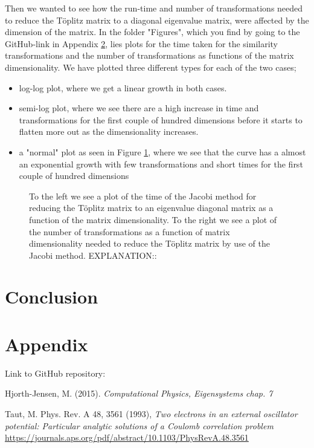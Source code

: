 \documentclass[12pt,a4paper,english]{article}
\begin{document}
Then we wanted to see how the run-time and number of transformations needed to reduce the Töplitz matrix to a diagonal eigenvalue matrix, were affected by the dimension of the matrix. In the folder "Figures", which you find by going to the GitHub-link in Appendix \ref{sect:appendix}, lies plots for the time taken for the similarity transformations and the number of transformations as functions of the matrix dimensionality. We have plotted three different types for each of the two cases; 
\begin{itemize}
	\item log-log plot, where we get a linear growth in both cases.
	\item semi-log plot, where we see there are a high increase in time and transformations for the first couple of hundred dimensions before it starts to flatten more out as the dimensionality increases.
	\item a "normal" plot as seen in Figure \ref{fig:time_transf}, where we see that the curve has a almost an exponential growth with few transformations and short times for the first couple of hundred dimensions
\end{itemize}
\begin{figure}[htbp]
	\caption{To the left we see a plot of the time of the Jacobi method for reducing the Töplitz matrix to an eigenvalue diagonal matrix as a function of the matrix dimensionality. To the right we see a plot of the number of transformations as a function of matrix dimensionality needed to reduce the Töplitz matrix by use of the Jacobi method. EXPLANATION::\label{fig:time_transf}}
\end{figure}

\section{Conclusion}

\appendix
\section{Appendix}
\label{sect:appendix}
Link to GitHub repository:

\begin{thebibliography}{}
Hjorth-Jensen, M. (2015). \textit{Computational Physics, Eigensystems chap. 7}

Taut, M. Phys. Rev. A 48, 3561 (1993), \textit{Two electrons in an external oscillator potential: Particular analytic solutions of a Coulomb correlation problem}\\
\url{https://journals.aps.org/pdf/abstract/10.1103/PhysRevA.48.3561}
\end{thebibliography}
\end{document}
